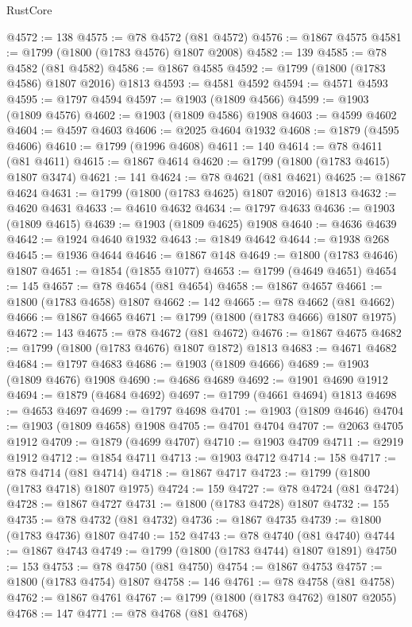 \begin{lexlean}{RustCore}
\begin{coremodule}
@4572 := 138
@4575 := @78 @4572 (@81 @4572)
@4576 := @1867 @4575
@4581 := @1799 (@1800 (@1783 @4576) @1807 @2008)
@4582 := 139
@4585 := @78 @4582 (@81 @4582)
@4586 := @1867 @4585
@4592 := @1799 (@1800 (@1783 @4586) @1807 @2016) @1813
@4593 := @4581 @4592
@4594 := @4571 @4593
@4595 := @1797 @4594
@4597 := @1903 (@1809 @4566)
@4599 := @1903 (@1809 @4576)
@4602 := @1903 (@1809 @4586) @1908
@4603 := @4599 @4602
@4604 := @4597 @4603
@4606 := @2025 @4604 @1932
@4608 := @1879 (@4595 @4606)
@4610 := @1799 (@1996 @4608)
@4611 := 140
@4614 := @78 @4611 (@81 @4611)
@4615 := @1867 @4614
@4620 := @1799 (@1800 (@1783 @4615) @1807 @3474)
@4621 := 141
@4624 := @78 @4621 (@81 @4621)
@4625 := @1867 @4624
@4631 := @1799 (@1800 (@1783 @4625) @1807 @2016) @1813
@4632 := @4620 @4631
@4633 := @4610 @4632
@4634 := @1797 @4633
@4636 := @1903 (@1809 @4615)
@4639 := @1903 (@1809 @4625) @1908
@4640 := @4636 @4639
@4642 := @1924 @4640 @1932
@4643 := @1849 @4642
@4644 := @1938 @268
@4645 := @1936 @4644
@4646 := @1867 @148
@4649 := @1800 (@1783 @4646) @1807
@4651 := @1854 (@1855 @1077)
@4653 := @1799 (@4649 @4651)
@4654 := 145
@4657 := @78 @4654 (@81 @4654)
@4658 := @1867 @4657
@4661 := @1800 (@1783 @4658) @1807
@4662 := 142
@4665 := @78 @4662 (@81 @4662)
@4666 := @1867 @4665
@4671 := @1799 (@1800 (@1783 @4666) @1807 @1975)
@4672 := 143
@4675 := @78 @4672 (@81 @4672)
@4676 := @1867 @4675
@4682 := @1799 (@1800 (@1783 @4676) @1807 @1872) @1813
@4683 := @4671 @4682
@4684 := @1797 @4683
@4686 := @1903 (@1809 @4666)
@4689 := @1903 (@1809 @4676) @1908
@4690 := @4686 @4689
@4692 := @1901 @4690 @1912
@4694 := @1879 (@4684 @4692)
@4697 := @1799 (@4661 @4694) @1813
@4698 := @4653 @4697
@4699 := @1797 @4698
@4701 := @1903 (@1809 @4646)
@4704 := @1903 (@1809 @4658) @1908
@4705 := @4701 @4704
@4707 := @2063 @4705 @1912
@4709 := @1879 (@4699 @4707)
@4710 := @1903 @4709
@4711 := @2919 @1912
@4712 := @1854 @4711
@4713 := @1903 @4712
@4714 := 158
@4717 := @78 @4714 (@81 @4714)
@4718 := @1867 @4717
@4723 := @1799 (@1800 (@1783 @4718) @1807 @1975)
@4724 := 159
@4727 := @78 @4724 (@81 @4724)
@4728 := @1867 @4727
@4731 := @1800 (@1783 @4728) @1807
@4732 := 155
@4735 := @78 @4732 (@81 @4732)
@4736 := @1867 @4735
@4739 := @1800 (@1783 @4736) @1807
@4740 := 152
@4743 := @78 @4740 (@81 @4740)
@4744 := @1867 @4743
@4749 := @1799 (@1800 (@1783 @4744) @1807 @1891)
@4750 := 153
@4753 := @78 @4750 (@81 @4750)
@4754 := @1867 @4753
@4757 := @1800 (@1783 @4754) @1807
@4758 := 146
@4761 := @78 @4758 (@81 @4758)
@4762 := @1867 @4761
@4767 := @1799 (@1800 (@1783 @4762) @1807 @2055)
@4768 := 147
@4771 := @78 @4768 (@81 @4768)

\end{coremodule}
\end{lexlean}
